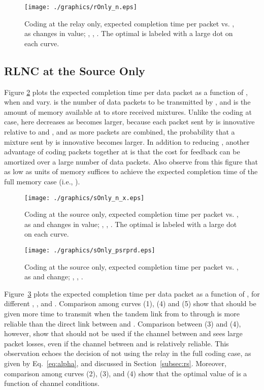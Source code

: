 \documentclass[journal, letterpaper]{IEEEtran}
\begin{document}
\begin{itemize}
\begin{figure}[t!]
  \centering
  \texttt{[image: ./graphics/rOnly\_n.eps]}
  \caption{Coding at the relay  only, expected completion time per packet   vs. , as  changes in value; , , . The optimal  is labeled with a large dot on each curve.}
  \label{fig:rOnly_n}
\end{figure}

\subsection{RLNC at the Source  Only}

Figure \ref{fig:sOnly_n} plots the expected completion time per data packet as a function of , when  and  vary.  is the number of data packets to be transmitted by , and  is the amount of memory available at  to store received mixtures. Unlike the coding at  case, here  decreases as  becomes larger, because each packet sent by  is innovative relative to  and , and as more packets are combined, the probability that a mixture sent by  is innovative becomes larger. In addition to reducing , another advantage of coding  packets together at  is that the cost for feedback can be amortized over a large number of data packets. Also observe from this figure that as low as  units of memory suffices to achieve the expected completion time of the full memory case (i.e., ).


\begin{figure}[t!]
\centering
  \texttt{[image: ./graphics/sOnly\_n\_x.eps]}
  \caption{Coding at the source  only, expected completion time per packet   vs. , as  and  changes in value; , , . The optimal  is labeled with a large dot on each curve.}
  \label{fig:sOnly_n}
\end{figure}
\begin{figure}[t!]
\centering
  \texttt{[image: ./graphics/sOnly\_psrprd.eps]}
  \caption{Coding at the source  only, expected completion time per packet  vs. , as  and  change; , , .}
  \label{fig:sOnly_psrprd}
\end{figure}

Figure~\ref{fig:sOnly_psrprd} plots the expected completion time per data packet as a function of , for different , , and . Comparison among curves (1), (4) and (5) show that  should be given more time to transmit when the tandem link from  to  through  is more reliable than the direct link between  and . Comparison between (3) and (4), however, show that  should not be used if the channel between  and  sees large packet losses, even if the channel between  and  is relatively reliable. This observation echoes the decision of not using the relay in the full coding case, as given by Eq.~\eqref{eq:alpha}, and discussed in Section~\ref{subsec:rs}. Moreover, comparison among curves (2), (3), and (4) show that the optimal value of  is a function of channel conditions.


\end{itemize}
\end{document}

